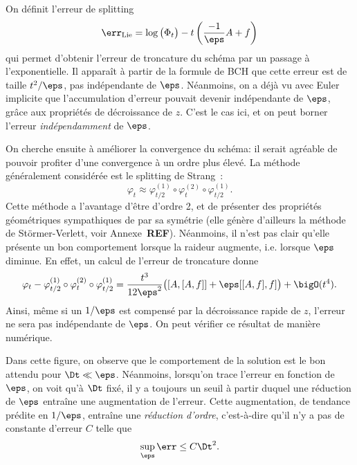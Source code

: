 On définit l'erreur de splitting 
\begin{equation*}
    \err_{\mathrm{Lie}} 
    = \log \big( \Phi_t \big) - t\left(\frac{-1}{\eps}A + f\right) 
\end{equation*}
qui permet d'obtenir l'erreur de troncature du schéma par un passage à l'exponentielle. Il apparaît à partir de la formule de BCH que cette erreur est de taille $t^2/\eps$, pas indépendante de $\eps$. Néanmoins, on a déjà vu avec Euler implicite que l'accumulation d'erreur pouvait devenir indépendante de $\eps$, grâce aux propriétés de décroissance de $z$. C'est le cas ici, et on peut borner l'erreur \textit{indépendamment} de $\eps$. 

On cherche ensuite à améliorer la convergence du schéma: il serait agréable de pouvoir profiter d'une convergence à un ordre plus élevé. La méthode généralement considérée est le splitting de Strang~:
\begin{equation*}
    \varphi_t \approx \varphi^{(1)}_{t/2} \circ \varphi^{(2)}_{t} \circ \varphi^{(1)}_{t/2} .
\end{equation*}
Cette méthode a l'avantage d'être d'ordre 2, et de présenter des propriétés géométriques sympathiques de par sa symétrie (elle génère d'ailleurs la méthode de Störmer-Verlett, voir Annexe~\textbf{REF}). Néanmoins, il n'est pas clair qu'elle présente un bon comportement lorsque la raideur augmente, i.e. lorsque $\eps$ diminue. En effet, un calcul de l'erreur de troncature donne 
\begin{equation*}
    \varphi_t - \varphi^{(1)}_{t/2} \circ \varphi^{(2)}_{t} \circ \varphi^{(1)}_{t/2} 
    = \frac{t^3}{12\eps^2} \big( [A,[A,f]] + \eps [[A,f],f] \big)
    + \bigO(t^4) .
\end{equation*}
Ainsi, même si un $1/\eps$ est compensé par la décroissance rapide de $z$, l'erreur ne sera pas indépendante de $\eps$. On peut vérifier ce résultat de manière numérique.


Dans cette figure, on observe que le comportement de la solution est le bon attendu pour $\Dt \ll \eps$. Néanmoins, lorsqu'on trace l'erreur en fonction de $\eps$, on voit qu'à $\Dt$ fixé, il y a toujours un seuil à partir duquel une réduction de $\eps$ entraîne une augmentation de l'erreur. Cette augmentation, de tendance prédite en $1/\eps$, entraîne une \textit{réduction d'ordre}, c'est-à-dire qu'il n'y a pas de constante d'erreur $C$ telle que 
\begin{equation*}
    \sup_\eps \err \leq C \Dt^2 .
\end{equation*}


